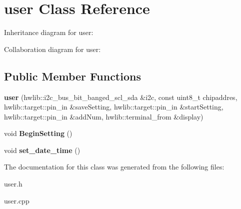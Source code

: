 \hypertarget{classuser}{}\section{user Class Reference}
\label{classuser}


Inheritance diagram for user\+:


Collaboration diagram for user\+:
\subsection*{Public Member Functions}
\begin{DoxyCompactItemize}
\item 
\mbox{\label{classuser_a140937f8c81560822a5fc64cfefffcac}} 
{\bfseries user} (hwlib\+::i2c\+\_\+bus\+\_\+bit\+\_\+banged\+\_\+scl\+\_\+sda \&i2c, const uint8\+\_\+t chipaddres, hwlib\+::target\+::pin\+\_\+in \&save\+Setting, hwlib\+::target\+::pin\+\_\+in \&start\+Setting, hwlib\+::target\+::pin\+\_\+in \&add\+Num, hwlib\+::terminal\+\_\+from \&display)
\item 
\mbox{\label{classuser_af17199133dfce25d87d53e716da3c65b}} 
void {\bfseries Begin\+Setting} ()
\item 
\mbox{\label{classuser_ae8ad51951cea1b9675c243bc63c3e7aa}} 
void {\bfseries set\+\_\+date\+\_\+time} ()
\end{DoxyCompactItemize}


The documentation for this class was generated from the following files\+:\begin{DoxyCompactItemize}
\item 
user.\+h\item 
user.\+cpp\end{DoxyCompactItemize}
